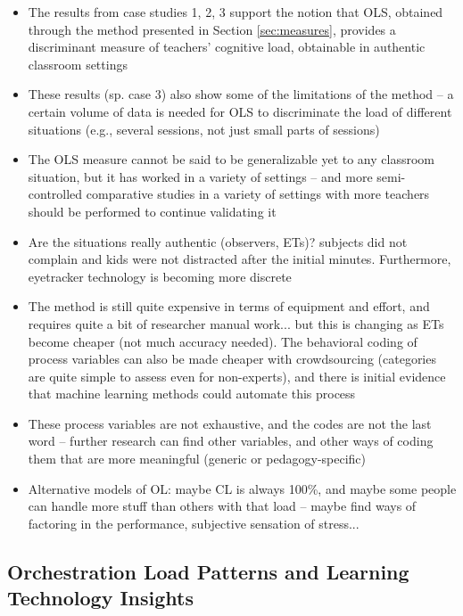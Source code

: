 \documentclass[10pt,journal,compsoc]{IEEEtran}
\begin{document}
\begin{itemize}
\item The results from case studies 1, 2, 3 support the notion that OLS, obtained through the method presented in Section \ref{sec:measures}, provides a discriminant measure of teachers' cognitive load, obtainable in authentic classroom settings
\item These results (sp. case 3) also show some of the limitations of the method -- a certain volume of data is needed for OLS to discriminate the load of different situations (e.g., several sessions, not just small parts of sessions)
\item The OLS measure cannot be said to be generalizable yet to any classroom situation, but it has worked in a variety of settings -- and more semi-controlled comparative studies in a variety of settings with more teachers should be performed to continue validating it
\item Are the situations really authentic (observers, ETs)? subjects did not complain and kids were not distracted after the initial minutes. Furthermore, eyetracker technology is becoming more discrete
\item The method is still quite expensive in terms of equipment and effort, and requires quite a bit of researcher manual work... but this is changing as ETs become cheaper (not much accuracy needed). The behavioral coding of process variables can also be made cheaper with crowdsourcing (categories are quite simple to assess even for non-experts), and there is initial evidence that machine learning methods could automate this process \cite{prieto2016teaching}
\item These process variables are not exhaustive, and the codes are not the last word -- further research can find other variables, and other ways of coding them that are more meaningful (generic or pedagogy-specific)
\item Alternative models of OL: maybe CL is always 100\%, and maybe some people can handle more stuff than others with that load -- maybe find ways of factoring in the performance, subjective sensation of stress...
\end{itemize}



\subsection{Orchestration Load Patterns and Learning Technology Insights}
\end{document}
